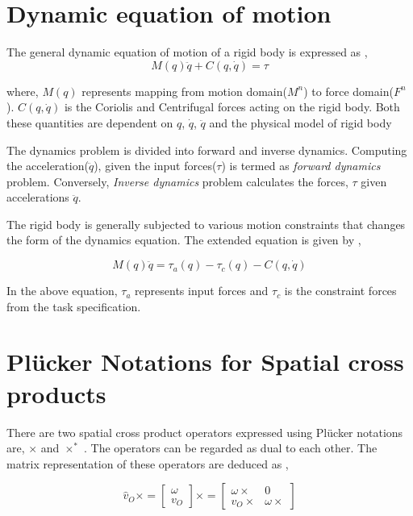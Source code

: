 \chapter{Dynamic equation of motion}\label{chap:dynamic}
The general dynamic equation of motion of a rigid body is expressed as \cite{featherstone2014rigid} \cite{shakhimardanov2015composable}, 
\begin{equation}
	\label{eq:dynamic}
	M(q)\ddot{q} + C(q, \dot{q}) = \tau 
\end{equation}

where, $M(q)$ represents mapping from motion domain($M^n$) to force domain($F^n$). $C(q, \dot{q})$ is the Coriolis and Centrifugal forces acting on the rigid body. Both these quantities are dependent on $q$, $\dot{q}$, $\ddot{q}$ and the physical model of rigid body \cite{featherstone2014rigid}

The dynamics problem is divided into forward and inverse dynamics. Computing the acceleration($\ddot{q}$), given the input forces($\tau$) is termed as \textit{forward dynamics} problem. Conversely, \textit{Inverse dynamics} problem calculates the forces, $\tau$ given accelerations $\ddot{q}$.

The rigid body is generally subjected to various motion constraints that changes the form of the dynamics equation. The extended equation is given by \cite{shakhimardanov2015composable},

\begin{equation}
\label{eq:extendeddynamic}
M(q)\ddot{q} = \tau_a(q) - \tau_c(q) -  C(q, \dot{q})
\end{equation}

In the above equation, $\tau_a$ represents input forces and $\tau_c$ is the constraint forces from the task specification.


\chapter{Pl{\"u}cker Notations for Spatial cross products}\label{chap:cross}

There are two spatial cross product operators expressed using Pl{\"u}cker notations are, $\times$ and $\times^*$ \cite{featherstone2014rigid}. The operators can be regarded as dual to each other. The matrix representation of these operators are deduced as \cite{featherstone2014rigid},

	\begin{equation}
	\label{eq:cross1}
		\hat v_O \times = \begin{bmatrix}
			\omega \\ v_O
		\end{bmatrix} \times = \begin{bmatrix}
			\omega \times & 0 \\
			v_O \times & \omega \times
		\end{bmatrix}
	\end{equation}
	
